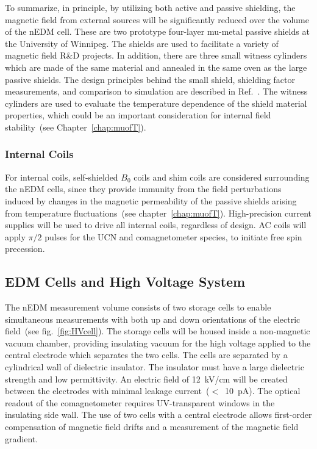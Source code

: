 To summarize, in principle, by utilizing both active and passive
shielding, the magnetic field from external sources will be
significantly reduced over the volume of the nEDM cell. These are two
prototype four-layer mu-metal passive shields at the University of
Winnipeg. The shields are used to facilitate a variety of magnetic
field R\&D projects. In addition, there are three small witness
cylinders which are made of the same material and annealed in the same
oven as the large passive shields. The design principles behind the
small shield, shielding factor measurements, and comparison to
simulation are described in Ref.~\cite{martin2015large}.  The witness
cylinders are used to evaluate the temperature dependence of the
shield material properties, which could be an important consideration
for internal field stability~(see Chapter~\ref{chap:muofT}).




\subsubsection{Internal Coils}
For internal coils, self-shielded $B_0$ coils and shim coils are
considered surrounding the nEDM cells, since they provide immunity
from the field perturbations induced by changes in the magnetic
permeability of the passive shields arising from temperature
fluctuations~(see chapter~\ref{chap:muofT}).  High-precision current
supplies
will be used to drive all internal coils, regardless of design. AC
coils will apply $\pi/2$ pulses for the UCN and comagnetometer
species, to initiate free spin precession.





\subsection{ EDM Cells and High Voltage System\label{sec:edmcell}}
The nEDM measurement volume consists of two storage cells to enable
simultaneous measurements with both up and down orientations of the
electric field~(see fig.~\ref{fig:HVcell}). The storage cells will be
housed inside a non-magnetic vacuum chamber, providing insulating
vacuum for the high voltage applied to the central electrode which
separates the two cells. The cells are separated by a cylindrical
wall of dielectric insulator. The insulator must have a large
dielectric strength and low permittivity. An electric field of
12~kV/cm will be created between the electrodes with minimal leakage
current~($<$~10~pA). The optical readout of the comagnetometer
requires UV-transparent windows in the insulating side wall. The use
of two cells with a central electrode allows first-order compensation
of magnetic field drifts and a measurement of the magnetic field
gradient.

